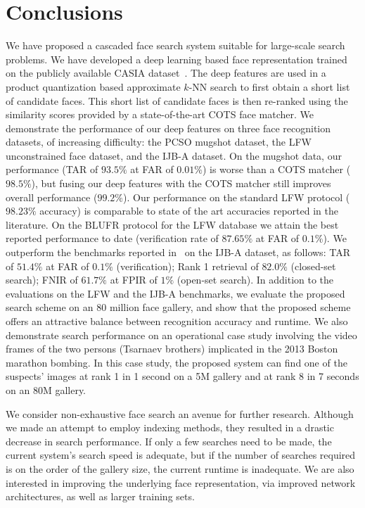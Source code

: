 \documentclass[10pt,journal,compsoc]{IEEEtran}
\begin{document}
\section{Conclusions}
We have proposed a cascaded face search system suitable for large-scale search problems. We have developed a deep learning based face representation trained on the publicly available CASIA dataset~\cite{DB:CASIA}. The deep features are used in a product quantization based approximate $k$-NN search to first obtain a short list of candidate faces. This short list of candidate faces is then re-ranked using the similarity scores provided by a state-of-the-art COTS face matcher. We demonstrate the performance of our deep features on three face recognition datasets, of increasing difficulty: the PCSO mugshot dataset, the LFW unconstrained face dataset, and the IJB-A dataset. On the mugshot data, our performance (TAR of $93.5\%$ at FAR of $0.01\%$) is worse than a COTS matcher ($98.5\%$), but fusing our deep features with the COTS matcher still improves overall performance ($99.2\%$). Our performance on the standard LFW protocol ($98.23\%$ accuracy) is comparable to state of the art accuracies reported in the literature. On the BLUFR protocol for the LFW database we attain the best reported performance to date (verification rate of $87.65\%$ at FAR of $0.1\%$). We outperform the benchmarks reported in~\cite{db:janus} on the IJB-A dataset, as follows: TAR of $51.4\%$ at FAR of $0.1\%$ (verification); Rank 1 retrieval of $82.0\%$ (closed-set search); FNIR of $61.7\%$ at FPIR of $1\%$ (open-set search). In addition to the evaluations on the LFW and the IJB-A benchmarks, we evaluate the proposed search scheme on an 80 million face gallery, and show that the proposed scheme offers an attractive balance between recognition accuracy and runtime. We also demonstrate search performance on an operational case study involving the video frames of the two persons (Tsarnaev brothers) implicated in the 2013 Boston marathon bombing. In this case study, the proposed system can find one of the suspects' images at rank 1 in 1 second on a 5M gallery and at rank 8 in 7 seconds on an 80M gallery.

We consider non-exhaustive face search an avenue for further research. Although we made an attempt to employ indexing methods, they resulted in a drastic decrease in search performance. If only a few searches need to be made, the current system's search speed is adequate, but if the number of searches required is on the order of the gallery size, the current runtime is inadequate. We are also interested in improving the underlying face representation, via improved network architectures, as well as larger training sets.
\end{document}
